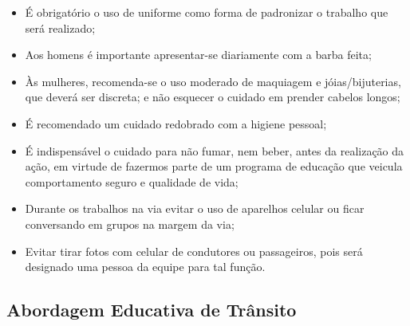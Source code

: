 \begin{itemize}
\item É obrigatório o uso de uniforme como forma de padronizar o trabalho que será realizado;
\item Aos homens é importante apresentar-se diariamente com a barba feita;
\item Às mulheres, recomenda-se o uso moderado de maquiagem e jóias/bijuterias, que deverá ser discreta; e não esquecer o cuidado em prender cabelos longos;
\item É recomendado um cuidado redobrado com a higiene pessoal;
\item É indispensável o cuidado para não fumar, nem beber, antes da realização da ação, em virtude de fazermos parte de um programa de educação que veicula comportamento seguro e qualidade de vida;
\item Durante os trabalhos na via evitar o uso de aparelhos celular ou ficar conversando em grupos na margem da via;
\item Evitar tirar fotos com celular de condutores ou passageiros, pois será designado uma pessoa da equipe para tal função.
\end{itemize}








\subsection{Abordagem Educativa de Trânsito}

